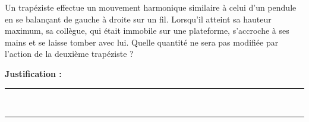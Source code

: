 Un trapéziste effectue un mouvement harmonique similaire à celui d’un pendule en se balançant de gauche à droite sur un fil. Lorsqu’il atteint sa hauteur maximum, sa collègue, qui était immobile sur une plateforme, s’accroche à ses mains et se laisse tomber avec lui. Quelle quantité ne sera pas modifiée par l’action de la deuxième trapéziste ?

\choices

\noindent\textbf{Justification :} \hrulefill \\[2.5ex]
\rule{\linewidth}{0.4pt} \\[2.5ex]
\rule{\linewidth}{0.4pt}
\vfill